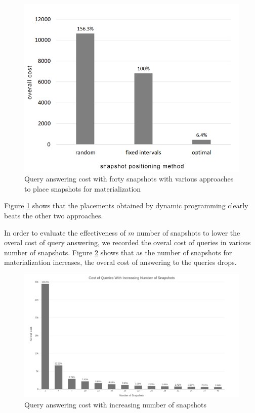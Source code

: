 \begin{figure}
	\centering
	\includegraphics[width=\textwidth]{figs/various_scenarios_cost.jpg}
	\caption{Query answering cost with forty snapshots with various approaches to place snapshots for materialization}
	\label{fig:approaches_cost}
\end{figure} 

Figure \ref{fig:approaches_cost} shows that the placements obtained by dynamic programming clearly beats the other two approaches.

In order to evaluate the effectiveness of $m$ number of snapshots to lower the overal cost of query answering, we recorded the overal cost of queries in various number of snapshots. Figure \ref{fig:snapshots_cost} shows that as the number of snapshots for materialization increases, the overal cost of answering to the queries drops.

\begin{figure}
	\centering
	\includegraphics[width=\textwidth]{figs/various_snapshot.jpg}
	\caption{Query answering cost with increasing number of snapshots}
	\label{fig:snapshots_cost}
\end{figure} 

